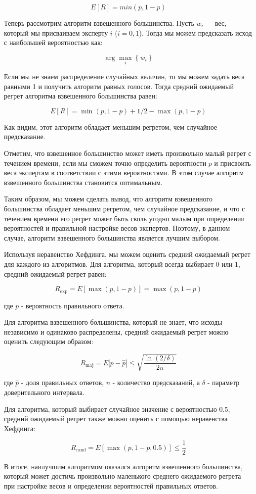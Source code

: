 \documentclass[a4paper,14pt]{extarticle}
\begin{document}
$$ E[R] = min\left(p, 1 - p\right)$$

Теперь рассмотрим алгоритм взвешенного большинства. Пусть $w_i$ — вес, который мы присваиваем эксперту $i$ ($i = 0, 1$). Тогда мы можем предсказать исход с наибольшей вероятностью как:

$$
\arg \max _i\left\{w_i\right\}
$$

Если мы не знаем распределение случайных величин, то мы можем задать веса равными 1 и получить алгоритм равных голосов. Тогда средний ожидаемый регрет алгоритма взвешенного большинства равен:

$$
E[R]=\min (p, 1-p)+1 / 2-\max (p, 1-p)
$$

Как видим, этот алгоритм обладает меньшим регретом, чем случайное предсказание.

Отметим, что взвешенное большинство может иметь произвольно малый регрет с течением времени, если мы сможем точно определить вероятности $p$ и присвоить веса экспертам в соответствии с этими вероятностями. В этом случае алгоритм взвешенного большинства становится оптимальным.

Таким образом, мы можем сделать вывод, что алгоритм взвешенного большинства обладает меньшим регретом, чем случайное предсказание, и что с течением времени его регрет может быть сколь угодно малым при определении вероятностей и правильной настройке весов экспертов. Поэтому, в данном случае, алгоритм взвешенного большинства является лучшим выбором.

Используя неравенство Хефдинга, мы можем оценить средний ожидаемый регрет для каждого из алгоритмов.
Для алгоритма, который всегда выбирает 0 или 1, средний ожидаемый регрет равен:

$$
R_{\exp }=E[\max (p, 1-p)]=\max (p, 1-p)
$$

где $p$ - вероятность правильного ответа.

Для алгоритма взвешенного большинства, который не знает, что исходы независимо и одинаково распределены, средний ожидаемый регрет можно оценить следующим образом:

$$
R_{\mathrm{maj}}=E\left|p-\hat{p}\right| \leq \sqrt{\frac{\ln (2 / \delta)}{2 n}}
$$

где $\hat{p}$ - доля правильных ответов, $n$ - количество предсказаний, а $\delta$ - параметр доверительного интервала.

Для алгоритма, который выбирает случайное значение с вероятностью 0.5, средний ожидаемый регрет также можно оценить с помощью неравенства Хефдинга:

$$
R_{\mathrm{rand}}=E[\max (p, 1-p, 0.5)] \leq \frac{1}{2}
$$

В итоге, наилучшим алгоритмом оказался алгоритм взвешенного большинства, который может достичь произвольно маленького среднего ожидаемого регрета при настройке весов и определении вероятностей правильных ответов.
\end{document}
